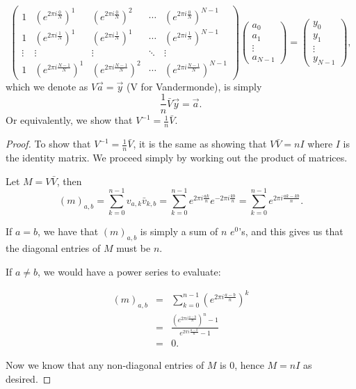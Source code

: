 \documentclass[12pt]{article}
\begin{document}
\begin{equation*}
\begin{pmatrix}
1 & (e^{2\pi i\frac{0}{N}})^1 & (e^{2\pi i\frac{0}{N}})^2 & \cdots & (e^{2\pi i\frac{0}{N}})^{N-1}\\ 
1 & (e^{2\pi i\frac{1}{N}})^1 & (e^{2\pi i\frac{1}{N}})^1 & \cdots & (e^{2\pi i\frac{1}{N}})^{N-1}\\ 
\vdots & \vdots & \vdots & \ddots & \vdots\\ 
1 & (e^{2\pi i\frac{N-1}{N}})^1  & (e^{2\pi i\frac{N-1}{N}})^{2}& \cdots & (e^{2\pi i\frac{N-1}{N}})^{N-1}
\end{pmatrix}
\begin{pmatrix}
a_0\\ 
a_1\\ 
\vdots\\ 
a_{N-1}
\end{pmatrix}
=
\begin{pmatrix}
y_0\\ 
y_1\\ 
\vdots\\ 
y_{N-1}
\end{pmatrix},
\end{equation*}
which we denote as $V\vec{a}=\vec{y}$ (V for Vandermonde), is simply 
\begin{equation*}
\frac{1}{n}\bar{V}\vec{y} = \vec{a}.
\end{equation*}
Or equivalently, we show that $V^{-1} = \frac{1}{n} \bar{V}$.
\bigskip
\begin{proof}
To show that $V^{-1} = \frac{1}{n} \bar{V}$, it is the same as showing that $V\bar{V} = nI$ where $I$ is the identity matrix. We proceed simply by working out the product of matrices.

Let $M = V\bar{V}$, then 
\begin{equation*}
(m)_{a,b} = \displaystyle \sum_{k=0}^{n-1} v_{a,k}\bar{v}_{k,b} = \displaystyle \sum_{k=0}^{n-1} e^{2\pi i \frac{ak}{n}}e^{-2\pi i \frac{kb}{n}} = \displaystyle \sum_{k=0}^{n-1} e^{2\pi i \frac{ak-kb}{n}}.
\end{equation*}

If $a=b$, we have that $(m)_{a,b}$ is simply a sum of $n$ $e^{0}$'s, and this gives us that the diagonal entries of $M$ must be $n$.

If $a\ne b$, we would have a power series to evaluate:

\begin{eqnarray*}
(m)_{a,b} &=& \displaystyle \sum_{k=0}^{n-1} \left(e^{2\pi i \frac{a-b}{n}}\right)^{k}\\
&=& \frac{\left(e^{2\pi i \frac{a-b}{n}}\right)^{n}-1}{e^{2\pi i \frac{a-b}{n}}-1}\\
&=& 0.
\end{eqnarray*}

Now we know that any non-diagonal entries of $M$ is 0, hence $M = nI$ as desired.
\end{proof}
\end{document}
